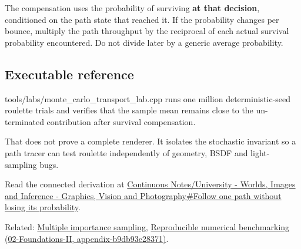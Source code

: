 The compensation uses the probability of surviving \textbf{at that decision}, conditioned on the path state that reached it. If the probability changes per bounce, multiply the path throughput by the reciprocal of each actual survival probability encountered. Do not divide later by a generic average probability.

\subsection{Executable reference}\label{executable-reference}

tools/labs/monte\_carlo\_transport\_lab.cpp runs one million deterministic-seed roulette trials and verifies that the sample mean remains close to the un-terminated contribution after survival compensation.

That does not prove a complete renderer. It isolates the stochastic invariant so a path tracer can test roulette independently of geometry, BSDF and light-sampling bugs.

Read the connected derivation at \href{Continuous\%20Notes/University\%20-\%20Worlds,\%20Images\%20and\%20Inference\%20-\%20Graphics,\%20Vision\%20and\%20Photography\#Follow\%20one\%20path\%20without\%20losing\%20its\%20probability}{Continuous Notes/University - Worlds, Images and Inference - Graphics, Vision and Photography\#Follow one path without losing its probability}.

Related: \hyperref[appendix-ca8898faf1a6]{Multiple importance sampling}, \href{}{Reproducible numerical benchmarking (02-Foundations-II, appendix-b9db93e28371)}.
